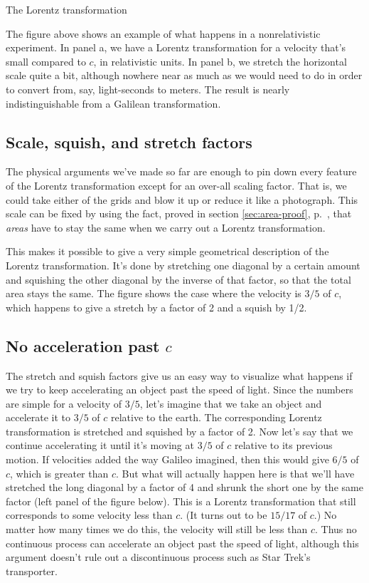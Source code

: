 \begin{section}{The Lorentz transformation}



The figure above shows an example of what happens in a nonrelativistic experiment. In panel a,
we have a Lorentz transformation for a velocity that's small compared to $c$, in relativistic units.
In panel b, we stretch the horizontal scale quite a bit, although nowhere near as much as we would
need to do in order to convert from, say, light-seconds to meters. The result is nearly indistinguishable
from a Galilean transformation.

\section{Scale, squish, and stretch factors}

The physical arguments we've made so far are enough to pin down every feature of the Lorentz transformation
except for an over-all scaling factor. That is, we could take either of the grids and blow it up or reduce it
like a photograph. This scale can be fixed by using the fact, proved in section \ref{sec:area-proof},
p.~\pageref{sec:area-proof}, that \emph{areas} have to stay the same when we carry out a Lorentz transformation.


This makes it possible to give a very simple geometrical description of the Lorentz transformation.
It's done by stretching one diagonal by a certain amount and squishing the other diagonal by the inverse
of that factor, so that the total area stays the same. The figure shows the case where the velocity is $3/5$ of
$c$, which happens to give a stretch by a factor of 2 and a squish by 1/2.

\section{No acceleration past $c$}

The stretch and squish factors give us an easy way to visualize what happens if we try to keep accelerating
an object past the speed of light. Since the numbers are simple for a velocity of $3/5$, let's imagine that
we take an object and accelerate it to $3/5$ of $c$ relative to the earth. The corresponding Lorentz transformation
is stretched and squished by a factor of 2. Now let's say that we continue accelerating it until it's moving at
$3/5$ of $c$ relative to its previous motion. If velocities added the way Galileo imagined, then this would
give $6/5$ of $c$, which is greater than $c$. But what will actually happen here is that we'll have stretched the
long diagonal by a factor of 4 and shrunk the short one by the same factor (left panel of the figure below).
This is a Lorentz transformation that
still corresponds to some velocity less than $c$. (It turns out to be $15/17$ of $c$.)
No matter how many times we do this, the velocity will still be
less than $c$. Thus no continuous process can accelerate an object past the speed of light, although this
argument doesn't rule out a discontinuous process such as Star Trek's transporter.


\end{section}
